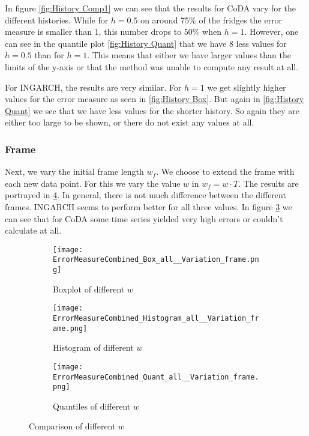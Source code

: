 In figure \ref{fig:History Comp1} we can see that the results for CoDA vary for the different histories. While for $h=0.5$ on around 75\% of the fridges the error measure is smaller than 1, this number drops to 50\% when $h=1$. However, one can see in the quantile plot \ref{fig:History Quant} that we have 8 less values for  $h=0.5$ than for $h=1$. This means that either we have larger values than the limits of the y-axis or that the method was unable to compute any result at all. 

For INGARCH, the results are very similar. For $h=1$ we get slightly higher values for the error measure as seen in \ref{fig:History Box}. But again in \ref{fig:History Quant} we see that we have less values for the shorter history. So again they are either too large to be shown, or there do not exist any values at all. 

\subsubsection{Frame}
\label{sec:Frame}

Next, we vary the initial frame length $w_f$. We choose to extend the frame with each new data point. For this we vary the value $w$ in $w_f=w\cdot T$. The results are portrayed in \ref{fig:Frame Comp1}. In general, there is not much difference between the different frames. INGARCH seems to perform better for all three values. In figure \ref{fig:Frame Quant} we can see that for CoDA some time series yielded very high errors or couldn't calculate at all. 
\begin{figure}[htb!]
\centering
\begin{subfigure}[b]{0.45\textwidth}
\texttt{[image: ErrorMeasureCombined\_Box\_all\_\_Variation\_frame.png]}
\caption{Boxplot of different $w$}
\label{fig:Frame Box}
\end{subfigure}
\hfill
\begin{subfigure}[b]{0.45\textwidth}
\texttt{[image: ErrorMeasureCombined\_Histogram\_all\_\_Variation\_frame.png]}
\caption{Histogram of different $w$}
\label{fig:Frame Hist}
\end{subfigure}
\hfill
\begin{subfigure}[b]{0.8\textwidth}
\texttt{[image: ErrorMeasureCombined\_Quant\_all\_\_Variation\_frame.png]}
\caption{Quantiles of different $w$}
\label{fig:Frame Quant}
\end{subfigure}
\caption{Comparison of different $w$}
\label{fig:Frame Comp1}
\end{figure}



